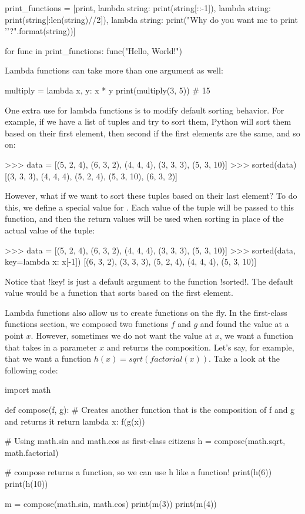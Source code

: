 \documentclass[11pt]{cselabheader}
\begin{document}
\begin{python3code}
print_functions = [print,
    lambda string: print(string[::-1]),
    lambda string: print(string[:len(string)//2]),
    lambda string: print("Why do you want me to print '{}'?".format(string))]

for func in print_functions:
    func("Hello, World!")
\end{python3code}

Lambda functions can take more than one argument as well:
\begin{python3code}
multiply = lambda x, y: x * y
print(multiply(3, 5)) # 15
\end{python3code}

One extra use for lambda functions is to modify default sorting behavior. For
example, if we have a list of tuples and try to sort them, Python will sort them
based on their first element, then second if the first elements are the same,
and so on:

\begin{pyconcode}
>>> data = [(5, 2, 4), (6, 3, 2), (4, 4, 4), (3, 3, 3), (5, 3, 10)]
>>> sorted(data)
[(3, 3, 3), (4, 4, 4), (5, 2, 4), (5, 3, 10), (6, 3, 2)]
\end{pyconcode}

However, what if we want to sort these tuples based on their last element? To do
this, we define a special  value for . Each
value of the tuple will be passed to this function, and then the return values
will be used when sorting in place of the actual value of the tuple:

\begin{pyconcode}
>>> data = [(5, 2, 4), (6, 3, 2), (4, 4, 4), (3, 3, 3), (5, 3, 10)]
>>> sorted(data, key=lambda x: x[-1])
[(6, 3, 2), (3, 3, 3), (5, 2, 4), (4, 4, 4), (5, 3, 10)]
\end{pyconcode}

Notice that \pythoninline!key! is just a default argument to the function 
\pythoninline!sorted!. The default value would be a function that sorts based on
the first element.

Lambda functions also allow us to create functions on the fly. In the
first-class functions section, we composed two functions $f$ and $g$ and found
the value at a point $x$. However, sometimes we do not want the value at $x$, we
want a function that takes in a parameter $x$ and returns the composition. Let's
say, for example, that we want a function $h(x) = sqrt(factorial(x))$. Take
a look at the following code:
\begin{python3code}
import math

def compose(f, g):
  # Creates another function that is the composition of f and g and returns it
  return lambda x: f(g(x))

# Using math.sin and math.cos as first-class citizens
h = compose(math.sqrt, math.factorial)

# compose returns a function, so we can use h like a function!
print(h(6))
print(h(10))

m = compose(math.sin, math.cos)
print(m(3))
print(m(4))
\end{python3code}
\end{document}

